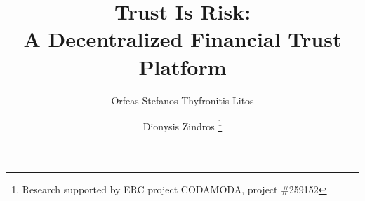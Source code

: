 \setcounter{page}{5}
\title{Trust Is Risk: \\ A Decentralized Financial Trust Platform}
\author{Orfeas Stefanos Thyfronitis Litos%
        \and Dionysis Zindros \fnmsep \thanks{Research supported by ERC project CODAMODA, project \#259152}}
\maketitle
